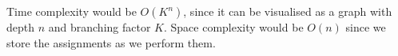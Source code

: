 \documentclass[12pt]{article}
\begin{document}
\begin{enumerate}[label=(\alph*)]
    Time complexity would be $O(K^n)$, since it can be visualised as a graph with depth $n$ and branching factor $K$. Space complexity would be $O(n)$ since we store the assignments as we perform them.
    
    
    
    

\end{enumerate}
\end{document}
